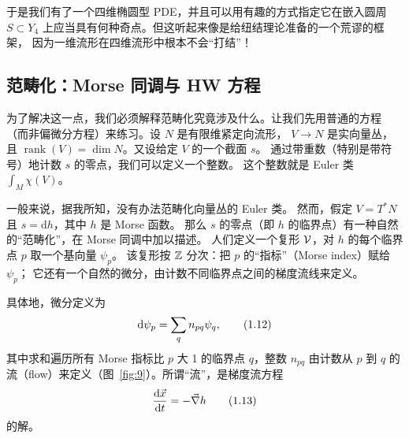 
于是我们有了一个四维椭圆型 PDE，并且可以用有趣的方式指定它在嵌入圆周
$S\subset Y_4$ 上应当具有何种奇点。但这听起来像是给纽结理论准备的一个荒谬的框架，
因为一维流形在四维流形中根本不会“打结”！

\subsection{范畴化：Morse 同调与 HW 方程}

为了解决这一点，我们必须解释范畴化究竟涉及什么。让我们先用普通的方程
（而非偏微分方程）来练习。设 $N$ 是有限维紧定向流形，
$V\to N$ 是实向量丛，且 $\operatorname{rank}(V)=\dim N$。又设给定 $V$ 的一个截面 $s$。
通过带重数（特别是带符号）地计数 $s$ 的零点，我们可以定义一个整数。
这个整数就是 Euler 类 $\int_M\chi(V)$。


一般来说，据我所知，没有办法范畴化向量丛的 Euler 类。
然而，假定 $V=T^*N$ 且 $s=\mathrm{d}h$，其中 $h$ 是 Morse 函数。
那么 $s$ 的零点（即 $h$ 的临界点）有一种自然的“范畴化”，在 Morse 同调中加以描述。
人们定义一个复形 $\mathcal{V}$，对 $h$ 的每个临界点 $p$ 取一个基向量 $\psi_p$。
该复形按 $\mathbb{Z}$ 分次：把 $p$ 的“指标”（Morse index）赋给 $\psi_p$；
它还有一个自然的微分，由计数不同临界点之间的梯度流线来定义。

具体地，微分定义为
\begin{equation}\stepcounter{equation}
  \mathrm{d}\psi_p=\sum_{q} n_{pq}\psi_q ,
  \tag{1.12}\label{eq:1.12}
\end{equation}
其中求和遍历所有 Morse 指标比 $p$ 大 1 的临界点 $q$，整数 $n_{pq}$ 由计数从 $p$ 到 $q$
的流（flow）来定义（图~\ref{fig:9}）。所谓“流”，是梯度流方程
\begin{equation}\stepcounter{equation}
  \frac{\mathrm{d}\vx}{\mathrm{d}t}=-\vnabla h
  \tag{1.13}\label{eq:1.13}
\end{equation}
的解。

